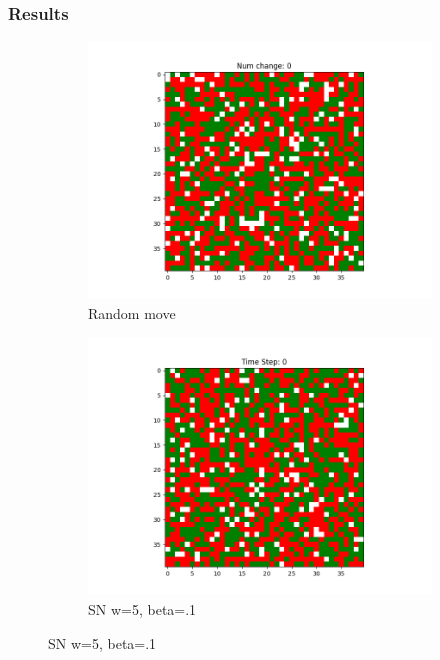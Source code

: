 \documentclass[11pt]{article}
\begin{document}
	\subsubsection{Results}
	\begin{figure}[h]
		\centering
		\begin{subfigure}{0.14\textwidth}
			\includegraphics[width=\linewidth]{initial_random.png}
			\caption{\centering Random move}
		\end{subfigure}\hfill
		\begin{subfigure}{0.14\textwidth}
			\includegraphics[width=\linewidth]{initial_cluster_w5b10.png}
			\caption{\centering SN w=5, beta=.1}
		\end{subfigure}\hfill

\end{figure}
\end{document}

